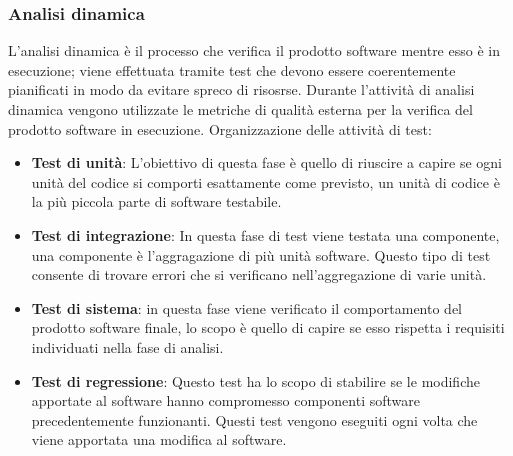     \subsubsection{Analisi dinamica}
    L'analisi dinamica è il processo che verifica il prodotto software mentre esso è in esecuzione; viene effettuata tramite test che devono essere coerentemente pianificati in modo da evitare spreco di risosrse.
    Durante l'attività di analisi dinamica vengono utilizzate le metriche di qualità esterna per la verifica del prodotto software in esecuzione.
    Organizzazione delle attività di test:
    \begin{itemize}
      \item \textbf{Test di unità}: L'obiettivo di questa fase è quello di riuscire a capire se ogni unità del codice si comporti esattamente come previsto, un unità di codice è la più piccola parte di software testabile.
      \item \textbf{Test di integrazione}: In questa fase di test viene testata una componente, una componente è l'aggragazione di più unità software.
      Questo tipo di test consente di trovare errori che si verificano nell'aggregazione di varie unità.
      \item \textbf{Test di sistema}: in questa fase viene verificato il comportamento del prodotto software finale, lo scopo è quello di capire se esso rispetta i requisiti individuati nella fase di analisi.
      \item \textbf{Test di regressione}: Questo test ha lo scopo di stabilire se le modifiche apportate al software hanno compromesso componenti software precedentemente funzionanti.
      Questi test vengono eseguiti ogni volta che viene apportata una modifica al software.
    \end{itemize}
